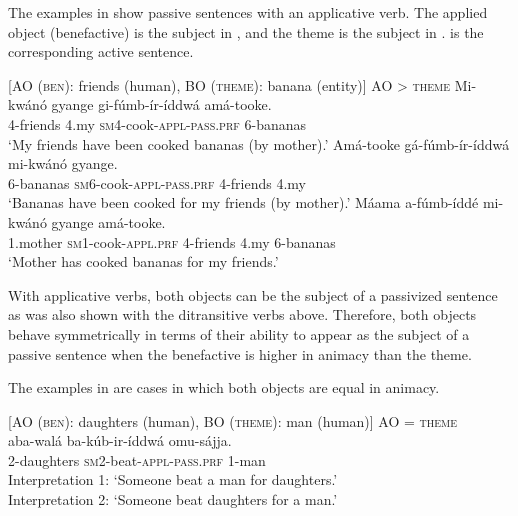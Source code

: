 \documentclass[output=paper,
            colorlinks, citecolor=brown
            ,draftmode
		  ]{langscibook}
\begin{document}
The examples in  show passive sentences with an applicative verb. The applied object (benefactive) is the subject in , and the theme is the subject in .  is the corresponding active sentence.



\ea%
    \label{ex:yoneda:21}
    [AO (\textsc{ben}): friends (human), BO (\textsc{theme}): banana (entity)]  AO > \textsc{theme}
    \ea\label{ex:yoneda:21a}\gll Mi-kwánó   gyange   gi-fúmb-ír-íddwá             amá-tooke.\\
         4-friends     4.my    \textsc{sm4}-cook-\textsc{appl-pass.prf}    6-bananas\\
    \glt ‘My friends have been cooked bananas (by mother).’
    \ex\label{ex:yoneda:21b}\gll Amá-tooke   gá-fúmb-ír-íddwá             mi-kwánó   gyange.\\
     6-bananas    \textsc{sm6}-cook-\textsc{appl-pass.prf}    4-friends    4.my \\
     \glt ‘Bananas have been cooked for my friends (by mother).’
     \ex\label{ex:yoneda:21c}\gll Máama     a-fúmb-íddé            mi-kwánó   gyange   amá-tooke.\\
     1.mother    \textsc{sm1}-cook-\textsc{appl.prf}    4-friends    4.my    6-bananas\\
     \glt ‘Mother has cooked bananas for my friends.’
    \z
\z


    With applicative verbs, both objects can be the subject of a passivized sentence as was also shown with the ditransitive verbs above. Therefore, both objects behave symmetrically in terms of their ability to appear as the subject of a passive sentence when the benefactive is higher in animacy than the theme.


    The examples in  are cases in which both objects are equal in animacy. 

\ea%
    \label{ex:yoneda:22}
    [AO (\textsc{ben}): daughters (human), BO (\textsc{theme}): man (human)]  AO = \textsc{theme}\\
    \gll aba-walá     ba-kúb-ir-íddwá             omu-sájja.\\
         2-daughters  \textsc{sm}2-beat-\textsc{appl}-\textsc{pass}.\textsc{prf}  1-man\\
    \glt Interpretation 1: ‘Someone beat a man for daughters.’  \\
    Interpretation 2: ‘Someone beat daughters for a man.’
    \z
\end{document}
